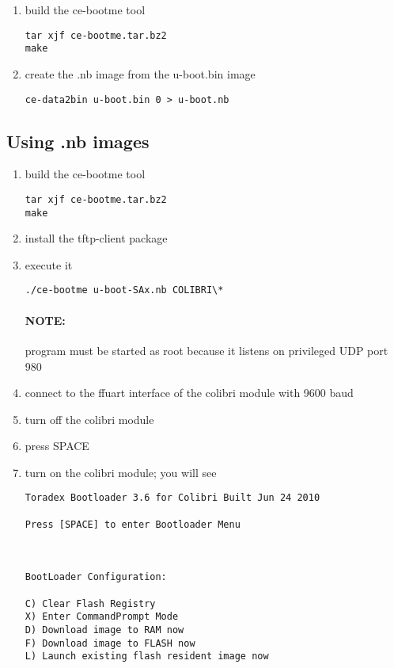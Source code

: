 \begin{enumerate}
\item build the ce-bootme tool
\begin{verbatim}
tar xjf ce-bootme.tar.bz2
make
\end{verbatim}
\item create the .nb image from the u-boot.bin image
\begin{verbatim}
ce-data2bin u-boot.bin 0 > u-boot.nb
\end{verbatim}
\end{enumerate}


\subsection{Using .nb images}

\begin{enumerate}
\item build the ce-bootme tool
\begin{verbatim}
tar xjf ce-bootme.tar.bz2
make
\end{verbatim}
\item install the tftp-client package
\item execute it
\begin{verbatim}
./ce-bootme u-boot-SAx.nb COLIBRI\*
\end{verbatim}%
%
\paragraph{NOTE:} program must be started as root because it listens
  on privileged UDP port 980

\item connect to the ffuart interface of the colibri module with 9600 baud

\item turn off the colibri module

\item press SPACE

\item turn on the colibri module; you will see

\begin{verbatim}
Toradex Bootloader 3.6 for Colibri Built Jun 24 2010

Press [SPACE] to enter Bootloader Menu



BootLoader Configuration:

C) Clear Flash Registry
X) Enter CommandPrompt Mode
D) Download image to RAM now
F) Download image to FLASH now
L) Launch existing flash resident image now
\end{verbatim}


\end{enumerate}
